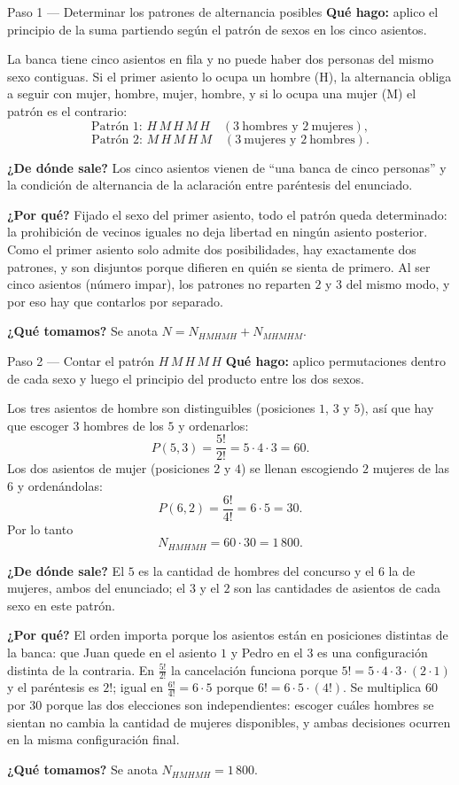 \documentclass[11pt]{article}
\begin{document}
\begin{paso}{Paso 1 --- Determinar los patrones de alternancia posibles}
\textbf{Qué hago:} aplico el principio de la suma partiendo según el patrón de sexos en los cinco asientos.

La banca tiene cinco asientos en fila y no puede haber dos personas del mismo sexo contiguas. Si el primer asiento lo ocupa un hombre (H), la alternancia obliga a seguir con mujer, hombre, mujer, hombre, y si lo ocupa una mujer (M) el patrón es el contrario:
\[
  \text{Patrón 1: } H\,M\,H\,M\,H \quad(3\ \text{hombres y }2\ \text{mujeres}),
\]
\[
  \text{Patrón 2: } M\,H\,M\,H\,M \quad(3\ \text{mujeres y }2\ \text{hombres}).
\]

\textbf{¿De dónde sale?} Los cinco asientos vienen de ``una banca de cinco personas'' y la condición de alternancia de la aclaración entre paréntesis del enunciado.

\textbf{¿Por qué?} Fijado el sexo del primer asiento, todo el patrón queda determinado: la prohibición de vecinos iguales no deja libertad en ningún asiento posterior. Como el primer asiento solo admite dos posibilidades, hay exactamente dos patrones, y son disjuntos porque difieren en quién se sienta de primero. Al ser cinco asientos (número impar), los patrones no reparten $2$ y $3$ del mismo modo, y por eso hay que contarlos por separado.

\textbf{¿Qué tomamos?} Se anota $N=N_{HMHMH}+N_{MHMHM}$.
\end{paso}

\begin{paso}{Paso 2 --- Contar el patrón $H\,M\,H\,M\,H$}
\textbf{Qué hago:} aplico permutaciones dentro de cada sexo y luego el principio del producto entre los dos sexos.

Los tres asientos de hombre son distinguibles (posiciones $1$, $3$ y $5$), así que hay que escoger $3$ hombres de los $5$ y ordenarlos:
\[
  P(5,3)=\frac{5!}{2!}=5\cdot 4\cdot 3=60 .
\]
Los dos asientos de mujer (posiciones $2$ y $4$) se llenan escogiendo $2$ mujeres de las $6$ y ordenándolas:
\[
  P(6,2)=\frac{6!}{4!}=6\cdot 5=30 .
\]
Por lo tanto
\[
  N_{HMHMH}=60\cdot 30=1\,800 .
\]

\textbf{¿De dónde sale?} El $5$ es la cantidad de hombres del concurso y el $6$ la de mujeres, ambos del enunciado; el $3$ y el $2$ son las cantidades de asientos de cada sexo en este patrón.

\textbf{¿Por qué?} El orden importa porque los asientos están en posiciones distintas de la banca: que Juan quede en el asiento $1$ y Pedro en el $3$ es una configuración distinta de la contraria. En $\frac{5!}{2!}$ la cancelación funciona porque $5!=5\cdot 4\cdot 3\cdot(2\cdot 1)$ y el paréntesis es $2!$; igual en $\frac{6!}{4!}=6\cdot 5$ porque $6!=6\cdot 5\cdot(4!)$. Se multiplica $60$ por $30$ porque las dos elecciones son independientes: escoger cuáles hombres se sientan no cambia la cantidad de mujeres disponibles, y ambas decisiones ocurren en la misma configuración final.

\textbf{¿Qué tomamos?} Se anota $N_{HMHMH}=1\,800$.
\end{paso}
\end{document}
